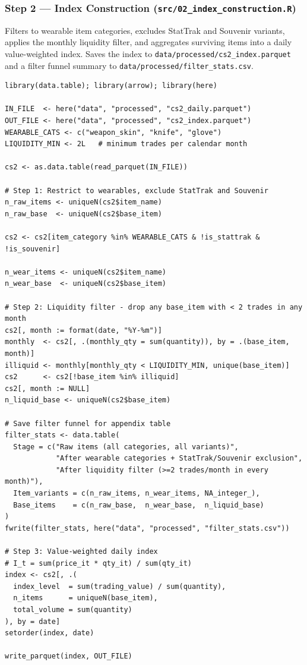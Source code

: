 \subsubsection*{Step 2 --- Index Construction (\texttt{src/02\_index\_construction.R})}

Filters to wearable item categories, excludes StatTrak and Souvenir variants,
applies the monthly liquidity filter, and aggregates surviving items into a
daily value-weighted index. Saves the index to
\texttt{data/processed/cs2\_index.parquet} and a filter funnel summary to
\texttt{data/processed/filter\_stats.csv}.

\begin{lstlisting}[style=Rstyle, caption={Step 2: Liquidity filter and value-weighted index construction}]
library(data.table); library(arrow); library(here)

IN_FILE  <- here("data", "processed", "cs2_daily.parquet")
OUT_FILE <- here("data", "processed", "cs2_index.parquet")
WEARABLE_CATS <- c("weapon_skin", "knife", "glove")
LIQUIDITY_MIN <- 2L   # minimum trades per calendar month

cs2 <- as.data.table(read_parquet(IN_FILE))

# Step 1: Restrict to wearables, exclude StatTrak and Souvenir
n_raw_items <- uniqueN(cs2$item_name)
n_raw_base  <- uniqueN(cs2$base_item)

cs2 <- cs2[item_category %in% WEARABLE_CATS & !is_stattrak & !is_souvenir]

n_wear_items <- uniqueN(cs2$item_name)
n_wear_base  <- uniqueN(cs2$base_item)

# Step 2: Liquidity filter - drop any base_item with < 2 trades in any month
cs2[, month := format(date, "%Y-%m")]
monthly  <- cs2[, .(monthly_qty = sum(quantity)), by = .(base_item, month)]
illiquid <- monthly[monthly_qty < LIQUIDITY_MIN, unique(base_item)]
cs2      <- cs2[!base_item %in% illiquid]
cs2[, month := NULL]
n_liquid_base <- uniqueN(cs2$base_item)

# Save filter funnel for appendix table
filter_stats <- data.table(
  Stage = c("Raw items (all categories, all variants)",
            "After wearable categories + StatTrak/Souvenir exclusion",
            "After liquidity filter (>=2 trades/month in every month)"),
  Item_variants = c(n_raw_items, n_wear_items, NA_integer_),
  Base_items    = c(n_raw_base,  n_wear_base,  n_liquid_base)
)
fwrite(filter_stats, here("data", "processed", "filter_stats.csv"))

# Step 3: Value-weighted daily index
# I_t = sum(price_it * qty_it) / sum(qty_it)
index <- cs2[, .(
  index_level  = sum(trading_value) / sum(quantity),
  n_items      = uniqueN(base_item),
  total_volume = sum(quantity)
), by = date]
setorder(index, date)

write_parquet(index, OUT_FILE)
\end{lstlisting}

